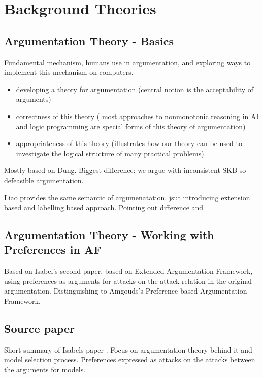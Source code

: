 \section{Background Theories} 

\subsection{Argumentation Theory - Basics}
Fundamental mechanism, humans use in argumentation, and exploring ways to implement this mechanism on computers. 
\begin{itemize}
	\item developing a theory for argumentation (central notion is the acceptability of arguments)
	\item correctness of this theory ( most approaches to nonmonotonic reasoning in AI and logic programming are special forms of this theory of argumentation)
	\item appropriateness of this theory (illustrates how our theory can be used to investigate the logical structure of many practical problems)
\end{itemize}
Mostly based on Dung\cite{Dung1995321}. Biggest difference: we argue with inconsistent SKB so defeasible argumentation. 

Liao \cite[Chapter 2]{liao} provides the same semantic of argumenatation. jsut introducing extension based and labelling based approach. Pointing out difference and 

\subsection{Argumentation Theory - Working with Preferences in AF}
Based on Isabel's second paper\cite{sassoon2016}, based on Extended Argumentation Framework\cite{Modgil2009}, using preferences as arguments for attacks on the attack-relation in the original argumentation.
Distinguishing to Amgouds's\cite{amgoud}  Preference based Argumentation Framework.

\subsection{Source paper}
Short summary of Isabels paper \cite{sassoon2014}. Focus on argumentation theory behind it and model selection process. Preferences expressed as attacks on the attacks between the arguments for models.

